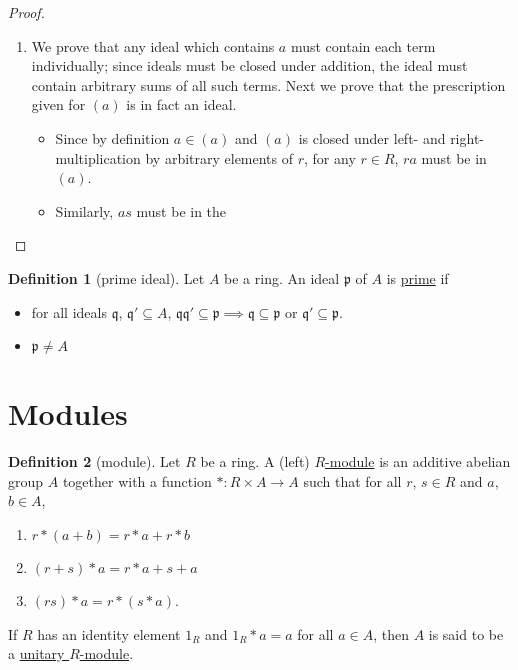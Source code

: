 \documentclass[a4paper]{report}
\newcommand{\defn}[1]{\ul{#1}}
\theoremstyle{definition}
\newtheorem{definition}{Definition}[section]
\theoremstyle{plain}
\theoremstyle{remark}
\begin{document}
\begin{proof}
  $\,$
  \begin{enumerate}
    \item We prove that any ideal which contains $a$ must contain each term individually; since ideals must be closed under addition, the ideal must contain arbitrary sums of all such terms. Next we prove that the prescription given for $(a)$ is in fact an ideal.
      \begin{itemize}
        \item Since by definition $a \in (a)$ and $(a)$ is closed under left- and right-multiplication by arbitrary elements of $r$, for any $r \in R$, $ra$ must be in $(a)$.
        \item Similarly, $as$ must be in the
      \end{itemize}
  \end{enumerate}
\end{proof}
\begin{definition}[prime ideal]
  \label{def:primeideal}
  Let $A$ be a ring. An ideal $\mathfrak{p}$ of $A$ is \defn{prime} if
  \begin{itemize}
    \item for all ideals $\mathfrak{q}$, $\mathfrak{q}' \subseteq A$, $\mathfrak{q}\mathfrak{q}' \subseteq \mathfrak{p} \implies \mathfrak{q} \subseteq \mathfrak{p}$ or $\mathfrak{q}' \subseteq \mathfrak{p}$.

    \item $\mathfrak{p} \neq A$
  \end{itemize}
\end{definition}

\section{Modules}
\begin{definition}[module]
  \label{def:module}
  Let $R$ be a ring. A (left) \defn{$R$-module} is an additive abelian group $A$ together with a function $*\colon R \times A \to A$ such that for all $r$, $s \in R$ and $a$, $b \in A$,
  \begin{enumerate}
    \item $r*(a+b) = r*a + r*b$
    \item $(r+s)*a = r*a + s+a$
    \item $(rs)*a = r*(s*a)$.
  \end{enumerate}
  If $R$ has an identity element $1_{R}$ and $1_{R}*a = a$ for all $a \in A$, then $A$ is said to be a \defn{unitary $R$-module}.
\end{definition}
\end{document}
